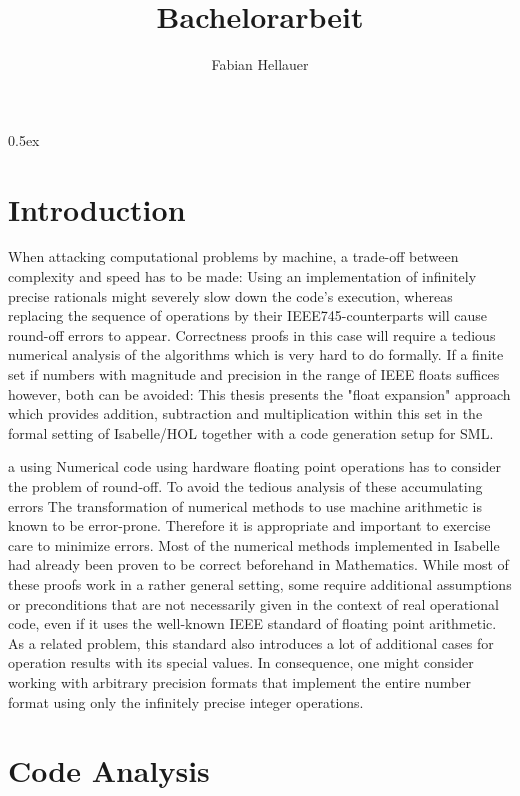 \documentclass[11pt,a4paper]{article}
\begin{document}
\title{Bachelorarbeit}
\author{Fabian Hellauer}
\maketitle

\tableofcontents

\parindent 0pt\parskip 0.5ex

\section{Introduction}
When attacking computational problems by machine, a trade-off between complexity and speed has to be made: Using an implementation of infinitely precise rationals might severely slow down the code's execution, whereas replacing the sequence of operations by their IEEE745-counterparts will cause round-off errors to appear. Correctness proofs in this case will require a tedious numerical analysis of the algorithms which is very hard to do formally. If a finite set if numbers with magnitude and precision in the range of IEEE floats suffices however, both can be avoided: This thesis presents the "float expansion" approach which provides addition, subtraction and multiplication within this set in the formal setting of Isabelle/HOL together with a code generation setup for SML.

 a using Numerical code using hardware floating point operations has to consider the problem of round-off. To avoid the tedious analysis of these accumulating errors
The transformation of numerical methods to use machine arithmetic is known to be error-prone.
Therefore it is appropriate and important to exercise care to minimize errors. Most of the numerical methods implemented in Isabelle had already been proven to be correct beforehand in Mathematics. While most of these proofs work in a rather general setting, some require additional assumptions or preconditions that are not necessarily given in the context of real operational code, even if it uses the well-known IEEE standard of floating point arithmetic. As a related problem, this standard also introduces a lot of additional cases for operation results with its special values. In consequence, one might consider working with arbitrary precision formats that implement the entire number format using only the infinitely precise integer operations.

\section{Code Analysis}
\end{document}
